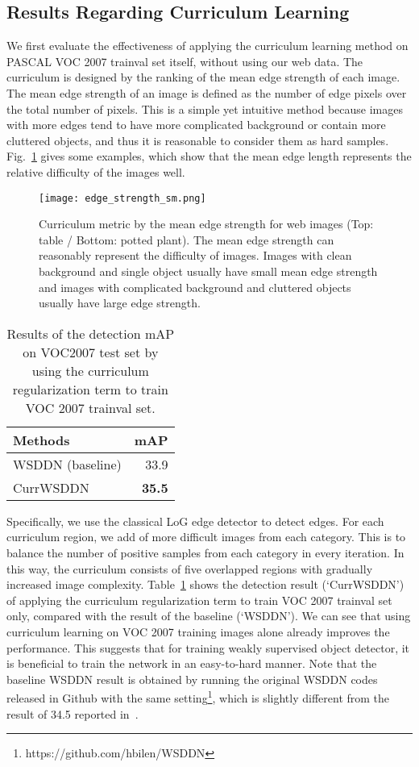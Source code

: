 \documentclass[10pt,twocolumn,letterpaper]{article}
\begin{document}
\subsection {Results Regarding Curriculum Learning}
We first evaluate the effectiveness of applying the curriculum learning method on PASCAL VOC 2007 trainval set itself, without using our web data. The curriculum is designed by the ranking of the mean edge strength of each image. The mean edge strength of an image is defined as the number of edge pixels over the total number of pixels. This is a simple yet intuitive method because images with more edges tend to have more complicated background or contain more cluttered objects, and thus it is reasonable to consider them as hard samples. Fig.~\ref{fig:edge_strength} gives some examples, which show that the mean edge length represents the relative difficulty of the images well.

\begin{figure}
\texttt{[image: edge\_strength\_sm.png]}
\caption{Curriculum metric by the mean edge strength for web images (Top: table / Bottom: potted plant). The mean edge strength can reasonably represent the difficulty of images. Images with clean background and single object usually have small mean edge strength and images with complicated background and cluttered objects usually have large edge strength.}
\label{fig:edge_strength}
\end{figure}

\begin{table}
\centering
\caption{Results of the detection mAP on VOC2007 test set by using the curriculum regularization term to train VOC 2007 trainval set. } \label{tb:CurrWSDDN}
\begin{tabular}{| l | r | }
\hline
Methods & mAP\\ \hline \hline
WSDDN (baseline)    & 33.9 \\ \hline
CurrWSDDN   & \textbf{35.5} \\ \hline
\end{tabular}
\end{table}



Specifically, we use the classical LoG edge detector to detect edges. For each curriculum region, we add  of more difficult images from each category. This is to balance the number of positive samples from each category in every iteration. In this way, the curriculum consists of five overlapped regions with gradually increased image complexity. Table~\ref{tb:CurrWSDDN} shows the detection result (`CurrWSDDN') of applying the curriculum regularization term to train VOC 2007 trainval set only, compared with the result of the baseline (`WSDDN'). We can see that using curriculum learning on VOC 2007 training images alone already improves the performance. This suggests that for training weakly supervised object detector, it is beneficial to train the network in an easy-to-hard manner. Note that the baseline WSDDN result is obtained by running the original WSDDN codes released in Github with the same setting\footnote{https://github.com/hbilen/WSDDN}, which is slightly different from the result of 34.5 reported in~\cite{bilen2016weakly}. 
\end{document}
